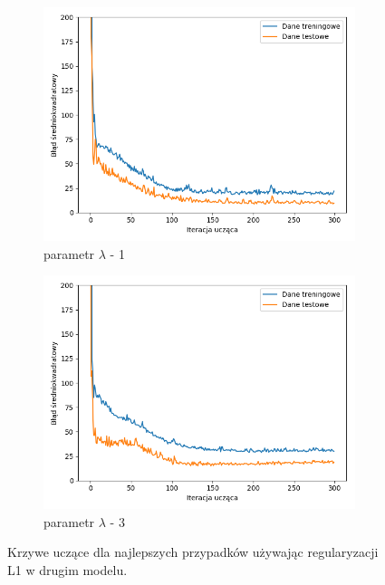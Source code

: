 \documentclass[12pt]{aghdpl}
\begin{document}
\begin{figure}[h]
		 	\begin{subfigure}{.5\linewidth}
		 		\includegraphics[width =\linewidth]{wykresy/6_regularyzacja/l1/regularyzacja_1_wykres_uczenia.png}
		 		\caption{parametr $\lambda$ - 1}
		 	\end{subfigure}
		 	\begin{subfigure}{.5\linewidth}
		 		\includegraphics[width =\linewidth]{wykresy/6_regularyzacja/l1/regularyzacja_3_wykres_uczenia.png}
		 		\caption{parametr $\lambda$ - 3}
		 	\end{subfigure}
		  	
		  	\caption{Krzywe uczące dla najlepszych przypadków używając regularyzacji L1 w drugim modelu.}
			\label{fig: drugi_model_przy_regularyzacji_l1_wykresy_uczenia}
		\end{figure}
		 	
\end{document}
